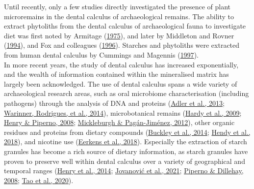 \documentclass[
  b5paper,
]{book}
\begin{document}
Until recently, only a few studies directly investigated the presence of
plant microremains in the dental calculus of archaeological remains. The
ability to extract phytoliths from the dental calculus of archaeological
fauna to investigate diet was first noted by Armitage
(\protect\hyperlink{ref-armitageExtractionIdentification1975}{1975}),
and later by Middleton and Rovner
(\protect\hyperlink{ref-middletonOpalPhytoliths1994}{1994}), and Fox and
colleagues (\protect\hyperlink{ref-foxPhytolithCalculus1996}{1996}).
Starches and phytoliths were extracted from human dental calculus by
Cummings and Magennis
(\protect\hyperlink{ref-cummingsMayanCalculus1997}{1997}).\\
In more recent years, the study of dental calculus has increased
exponentially, and the wealth of information contained within the
mineralised matrix has largely been acknowledged. The use of dental
calculus spans a wide variety of archaeological research areas, such as
oral microbiome characterisation (including pathogens) through the
analysis of DNA and proteins
(\protect\hyperlink{ref-adlerSequencingAncient2013}{Adler et al., 2013};
\protect\hyperlink{ref-warinnerPathogensHost2014}{Warinner, Rodrigues,
et al., 2014}), microbotanical remains
(\protect\hyperlink{ref-hardyStarchGranules2009}{Hardy et al., 2009};
\protect\hyperlink{ref-henryCalculusSyria2008}{Henry \& Piperno, 2008};
\protect\hyperlink{ref-mickleburghNewInsights2012}{Mickleburgh \&
Pagán-Jiménez, 2012}), other organic residues and proteins from dietary
compounds (\protect\hyperlink{ref-buckleyDentalCalculus2014}{Buckley et
al., 2014}; \protect\hyperlink{ref-hendyProteomicCalculus2018}{Hendy et
al., 2018}), and nicotine use
(\protect\hyperlink{ref-eerkensDentalCalculus2018}{Eerkens et al.,
2018}). Especially the extraction of starch granules has become a rich
source of dietary information, as starch granules have proven to
preserve well within dental calculus over a variety of geographical and
temporal ranges
(\protect\hyperlink{ref-henryNeanderthalCalculus2014}{Henry et al.,
2014}; \protect\hyperlink{ref-jovanovicNeolithicCalculus2021}{Jovanović
et al., 2021}; \protect\hyperlink{ref-pipernoStarchGrains2008}{Piperno
\& Dillehay, 2008}; \protect\hyperlink{ref-taoWheatCalculus2020}{Tao et
al., 2020}).
\end{document}
